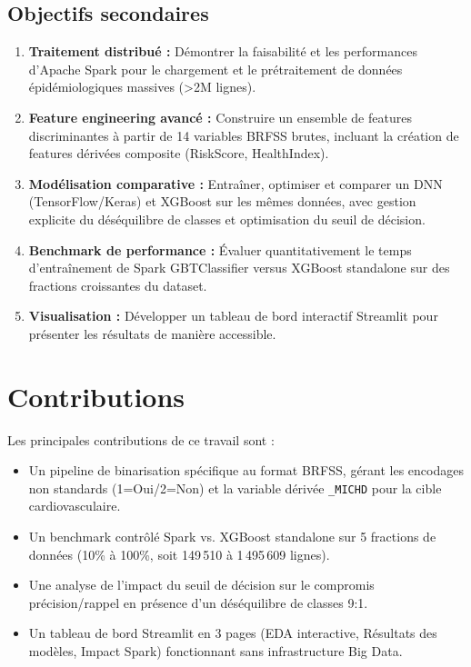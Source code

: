 \subsection{Objectifs secondaires}

\begin{enumerate}
    \item \textbf{Traitement distribué :} Démontrer la faisabilité et les performances d'Apache Spark pour le chargement et le prétraitement de données épidémiologiques massives (>2M lignes).

    \item \textbf{Feature engineering avancé :} Construire un ensemble de features discriminantes à partir de 14 variables BRFSS brutes, incluant la création de features dérivées composite (RiskScore, HealthIndex).

    \item \textbf{Modélisation comparative :} Entraîner, optimiser et comparer un DNN (TensorFlow/Keras) et XGBoost sur les mêmes données, avec gestion explicite du déséquilibre de classes et optimisation du seuil de décision.

    \item \textbf{Benchmark de performance :} Évaluer quantitativement le temps d'entraînement de Spark GBTClassifier versus XGBoost standalone sur des fractions croissantes du dataset.

    \item \textbf{Visualisation :} Développer un tableau de bord interactif Streamlit pour présenter les résultats de manière accessible.
\end{enumerate}

\section{Contributions}

Les principales contributions de ce travail sont :

\begin{itemize}
    \item Un pipeline de binarisation spécifique au format BRFSS, gérant les encodages non standards (1=Oui/2=Non) et la variable dérivée \texttt{\_MICHD} pour la cible cardiovasculaire.
    \item Un benchmark contrôlé Spark vs. XGBoost standalone sur 5 fractions de données (10\% à 100\%, soit 149\,510 à 1\,495\,609 lignes).
    \item Une analyse de l'impact du seuil de décision sur le compromis précision/rappel en présence d'un déséquilibre de classes 9:1.
    \item Un tableau de bord Streamlit en 3 pages (EDA interactive, Résultats des modèles, Impact Spark) fonctionnant sans infrastructure Big Data.
\end{itemize}


